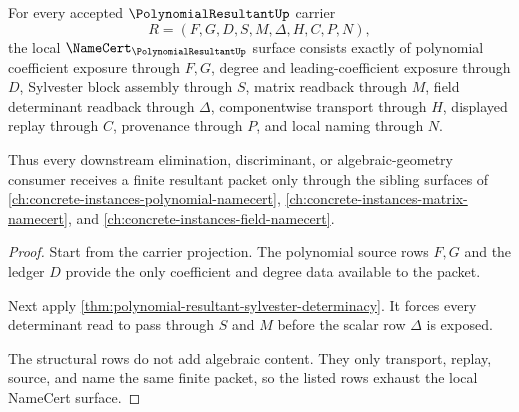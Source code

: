 \begin{theorem}
\label{thm:polynomial-resultant-namecert-obligations}
For every accepted $\PolynomialResultantUp$ carrier
$$
R=(F,G,D,S,M,\Delta,H,C,P,N),
$$
the local $\NameCert_{\PolynomialResultantUp}$ surface consists exactly of polynomial coefficient exposure through $F,G$, degree and leading-coefficient exposure through $D$, Sylvester block assembly through $S$, matrix readback through $M$, field determinant readback through $\Delta$, componentwise transport through $H$, displayed replay through $C$, provenance through $P$, and local naming through $N$.

Thus every downstream elimination, discriminant, or algebraic-geometry consumer receives a finite resultant packet only through the sibling surfaces of \autoref{ch:concrete-instances-polynomial-namecert}, \autoref{ch:concrete-instances-matrix-namecert}, and \autoref{ch:concrete-instances-field-namecert}.
\end{theorem}
\begin{proof}
Start from the carrier projection. The polynomial source rows $F,G$ and the ledger $D$ provide the only coefficient and degree data available to the packet.

Next apply \autoref{thm:polynomial-resultant-sylvester-determinacy}. It forces every determinant read to pass through $S$ and $M$ before the scalar row $\Delta$ is exposed.

The structural rows do not add algebraic content. They only transport, replay, source, and name the same finite packet, so the listed rows exhaust the local NameCert surface.
\end{proof}




